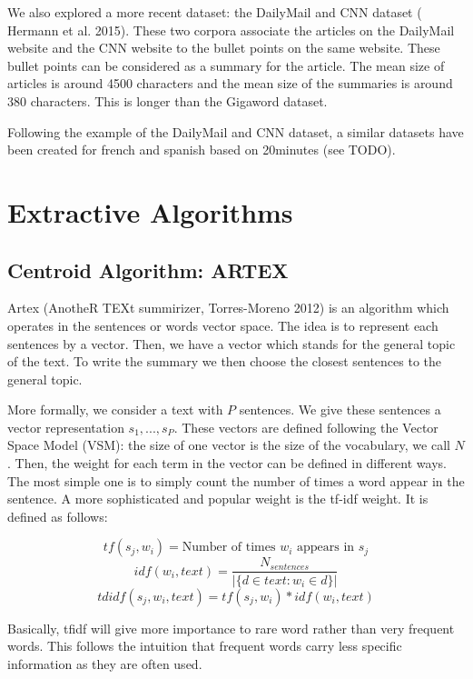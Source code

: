 \documentclass[11pt,a4paper,oldfontcommands]{memoir}
\begin{document}
We also explored a more recent dataset: the DailyMail and CNN dataset (\cite{DBLP:journals/corr/HermannKGEKSB15} Hermann et al. 2015). These two corpora associate the articles on the DailyMail website and the CNN website to the bullet points on the same website. These bullet points can be considered as a summary for the article. The mean size of articles is around 4500 characters and the mean size of the summaries is around 380 characters. This is longer than the Gigaword dataset.

Following the example of the DailyMail and CNN dataset, a similar datasets have been created for french and spanish based on 20minutes (see TODO).

\section{Extractive Algorithms}

\subsection{Centroid Algorithm: ARTEX}
\label{ARTEX}

Artex (AnotheR TEXt summirizer, \cite{DBLP:journals/corr/abs-1210-3312} Torres-Moreno 2012) is an algorithm which operates in the sentences or words vector space. The idea is to represent each sentences by a vector. Then, we have a vector which stands for the general topic of the text. To write the summary we then choose the closest sentences to the general topic.

More formally, we consider a text with $P$ sentences. We give these sentences a vector representation $s_1,...,s_P$. These vectors are defined following the Vector Space Model (VSM): the size of one vector is the size of the vocabulary, we call $N$. Then, the weight for each term in the vector can be defined in different ways. The most simple one is to simply count the number of times a word appear in the sentence. A more sophisticated and popular weight is the tf-idf weight. It is defined as follows: 

\[tf(s_j,w_i)=\text{Number of times }w_i\text{ appears in }s_j\]
\[idf(w_i, text)=\frac{N_{sentences}}{|\{d \in text: w_i \in d \}|}\]
\[tdidf(s_j,w_i, text)=tf(s_j,w_i)*idf(w_i, text)\]

Basically, tfidf will give more importance to rare word rather than very frequent words. This follows the intuition that frequent words carry less specific information as they are often used.
\end{document}
